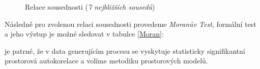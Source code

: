 \documentclass[11pt, a4paper]{article}
\begin{document}
  \begin{figure}[ht]
\label{}
\centering
\noindent{}
\caption{Relace sousednosti (\textit{7 nejbližších sousedů})}
\label{Relace sousednosti}
\end{figure}

Následně pro zvolenou relaci sousednosti provedeme \textit{Moranův Test}, formální test a jeho výstup je možné sledovat v tabulce \ref{Moran}:
  \clearpage

\begin{table}[!htbp] \centering 
\caption{Moranův Test 7-NN} 
\label{Moran} 
\end{table} 

je patrné, že v data generujícím procesu se vyskytuje statisticky signifikantní prostorová autokorelace a volíme metodiku prostorových modelů. 
\end{document}
